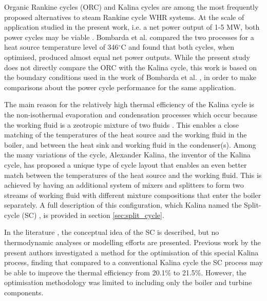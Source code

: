 \documentclass[review,3p]{elsarticle}
\begin{document}
Organic Rankine cycles (ORC) and Kalina cycles are among the most frequently proposed alternatives to steam Rankine cycle WHR systems. At the scale of application studied in the present work, i.e. a net power output of 1-5 MW, both power cycles may be viable \cite{Tchanche20113963,Jonsson2001c}. Bombarda et al. \cite{Bombarda2010b} compared the two processes for a heat source temperature level of 346$^\circ$C and found that both cycles, when optimised, produced almost equal net power outputs. While the present study does not directly compare the ORC with the Kalina cycle, this work is based on the boundary conditions used in the work of Bombarda et al. \cite{Bombarda2010b}, in order to make comparisons about the power cycle performance for the same application.

\begin{table*}[htbp]
  \begin{framed}
  \small
    \printnomenclature
  \end{framed}
\end{table*}

The main reason for the relatively high thermal efficiency of the Kalina cycle is the non-isothermal evaporation and condensation processes which occur because the working fluid is a zeotropic mixture of two fluids \cite{Wang2009a}. This enables a close matching of the temperatures of the heat source and the working fluid in the boiler, and between the heat sink and working fluid in the condenser(s). Among the many variations of the cycle, Alexander Kalina, the inventor of the Kalina cycle, has proposed a unique type of cycle layout that enables an even better match between the temperatures of the heat source and the working fluid. This is achieved by having an additional system of mixers and splitters to form two streams of working fluid with different mixture compositions that enter the boiler separately. A full description of this configuration, which Kalina  named the Split-cycle (SC) \cite{Kalina1986a}, is provided in section \ref{sec:split_cycle}.

In the literature \cite{Kalina1985a,Kalina1986a}, the conceptual idea of the SC is described, but no thermodynamic analyses or modelling efforts are presented. Previous work by the present authors \cite{larsen2012} investigated a method for the optimisation of this special Kalina process, finding that compared to a conventional Kalina cycle the SC process may be able to improve the thermal efficiency from 20.1\% to 21.5\%. However, the optimisation methodology was limited to including only the boiler and turbine components. 
\end{document}
